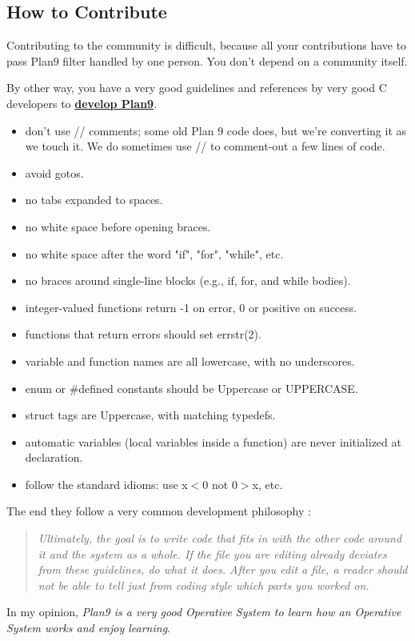 \subsection{How to Contribute}

\par Contributing to the community is difficult, because all your contributions have to pass Plan9 filter handled by one person. You don't depend on a community itself.

\par By other way, you have a very good guidelines and references by very good C developers to \textbf {\href{http://plan9.bell-labs.com/magic/man2html/6/style}{develop Plan9}}.

\begin{itemize}
	\item don't use // comments; some old Plan 9 code does, but we're converting it as we touch it. We do sometimes use // to comment-out a few lines of code.
	\item avoid gotos.
	\item no tabs expanded to spaces.
	\item no white space before opening braces.
	\item no white space after the word "if", "for", "while", etc.
	\item no braces around single-line blocks (e.g., if, for, and while bodies).
	\item integer-valued functions return -1 on error, 0 or positive on success.
	\item functions that return errors should set errstr(2).
	\item variable and function names are all lowercase, with no underscores.
	\item enum or \#defined constants should be Uppercase or UPPERCASE.
	\item struct tags are Uppercase, with matching typedefs.
	\item automatic variables (local variables inside a function) are never initialized at declaration.
	\item follow the standard idioms: use x$<$0 not 0$>$x, etc.
\end{itemize} The end they follow a very common development philosophy :

\begin{quotation}
    \textit{Ultimately, the goal is to write code that fits in with the other code around it and the system as a whole. If the file you are editing already deviates from these guidelines, do what it does. After you edit a file, a reader should not be able to tell just from coding style which parts you worked on.}
\end{quotation}

\par In my opinion, \textit{Plan9 is a very good Operative System to learn how an Operative System works and enjoy learning}.

